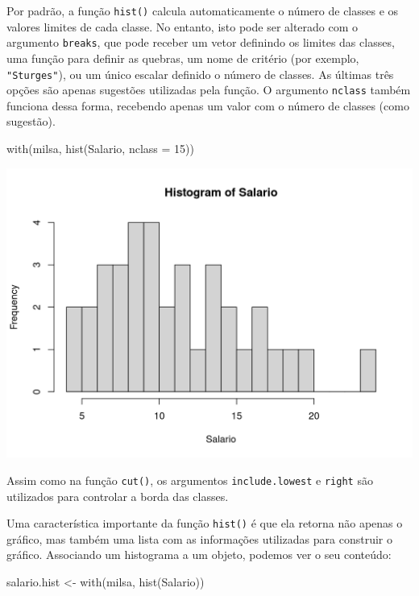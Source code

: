 \documentclass[
  10pt,
  a4paper]{book}
\newenvironment{Shaded}{\begin{snugshade}}{\end{snugshade}}
\newcommand{\AttributeTok}[1]{\textcolor[rgb]{0.77,0.63,0.00}{#1}}
\newcommand{\DecValTok}[1]{\textcolor[rgb]{0.00,0.00,0.81}{#1}}
\newcommand{\FunctionTok}[1]{\textcolor[rgb]{0.00,0.00,0.00}{#1}}
\newcommand{\NormalTok}[1]{#1}
\newcommand{\OtherTok}[1]{\textcolor[rgb]{0.56,0.35,0.01}{#1}}
\begin{document}
Por padrão, a função \texttt{hist()} calcula automaticamente o número de
classes e os valores limites de cada classe. No entanto, isto pode ser
alterado com o argumento \texttt{breaks}, que pode receber um vetor
definindo os limites das classes, uma função para definir as quebras, um
nome de critério (por exemplo, \texttt{"Sturges"}), ou um único escalar
definido o número de classes. As últimas três opções são apenas
sugestões utilizadas pela função. O argumento \texttt{nclass} também funciona
dessa forma, recebendo apenas um valor com o número de classes (como
sugestão).

\begin{Shaded}
\begin{Highlighting}[]
\FunctionTok{with}\NormalTok{(milsa, }\FunctionTok{hist}\NormalTok{(Salario, }\AttributeTok{nclass =} \DecValTok{15}\NormalTok{))}
\end{Highlighting}
\end{Shaded}

\begin{center}\includegraphics{figures/unnamed-chunk-312-1} \end{center}

Assim como na função \texttt{cut()}, os argumentos \texttt{include.lowest} e \texttt{right}
são utilizados para controlar a borda das classes.

Uma característica importante da função \texttt{hist()} é que ela retorna não
apenas o gráfico, mas também uma lista com as informações utilizadas
para construir o gráfico. Associando um histograma a um objeto, podemos
ver o seu conteúdo:

\begin{Shaded}
\begin{Highlighting}[]
\NormalTok{salario.hist }\OtherTok{\textless{}{-}} \FunctionTok{with}\NormalTok{(milsa, }\FunctionTok{hist}\NormalTok{(Salario))}
\end{Highlighting}
\end{Shaded}
\end{document}
